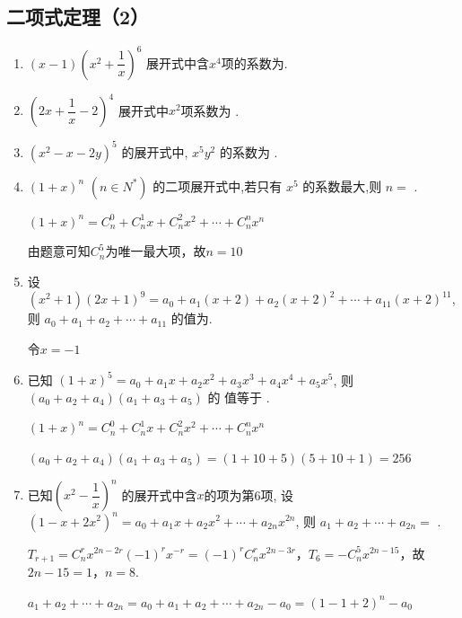 \subsection*{二项式定理（2）}

\begin{enumerate}
\item $(x-1)\left(x^{2}+\dfrac{1}{x}\right)^{6}$ 展开式中含$x^4$项的系数为.

\item $\left(2x+\dfrac{1}{x}-2\right)^{4}$ 展开式中$x^2$项系数为 .

\item $(x^{2}-x-2y)^{5}$ 的展开式中, $x^{5}y^{2}$ 的系数为 .

\item $(1+x)^{n}$ $(n\in N^{*})$ 的二项展开式中,若只有 $x^{5}$ 的系数最大,则 $n=$ .
\begin{jieda}
    $(1+x)^{n} = C_n^0+C_n^1x+C_n^2x^2+\cdots + C_n^nx^n$

    由题意可知$C_n^5$为唯一最大项，故$n = 10$
\end{jieda}

\item 设 $(x^{2}+1)(2x+1)^{9}=a_{0}+a_{1}(x+2)+a_{2}(x+2)^{2}+\cdots+a_{11}(x+2)^{11}$,则 $a_{0}+a_{1}+a_{2}+\cdots+a_{11}$ 的值为.
\begin{jieda}
    令$x = -1$
\end{jieda}

\item 已知 $(1+x)^{5} = a_{0} + a_{1}x + a_{2}x^{2} + a_{3}x^{3} + a_{4}x^{4} + a_{5}x^{5}$, 则 $(a_{0}+a_{2}+a_{4})(a_{1}+a_{3}+a_{5})$ 的 值等于 .
\begin{jieda}
    $(1+x)^{n} = C_n^0+C_n^1x+C_n^2x^2+\cdots + C_n^nx^n$

    $(a_{0}+a_{2}+a_{4})(a_{1}+a_{3}+a_{5}) = (1+10+5)(5+10+1) = 256$
\end{jieda}

\item 已知$\left(x^{2}-\dfrac{1}{x}\right)^{n}$ 的展开式中含$x$的项为第6项, 设$(1-x+2x^{2})^{n}=a_{0}+a_{1}x+a_{2}x^{2}+\cdots+a_{2n}x^{2n}$, 则 $a_{1}+a_{2}+\cdots+a_{2n}=$ .
\begin{jieda}
    $T_{r+1} = C_n^rx^{2n-2r}(-1)^rx^{-r} = (-1)^rC_n^rx^{2n-3r}$，$T_6 = -C_n^5x^{2n-15}$，故$2n-15 = 1$，$n = 8$.

    $a_{1}+a_{2}+\cdots+a_{2n}= a_0 + a_{1}+a_{2}+\cdots+a_{2n} - a_0 = (1-1+2)^n-a_0$


\end{jieda}
\end{enumerate}
